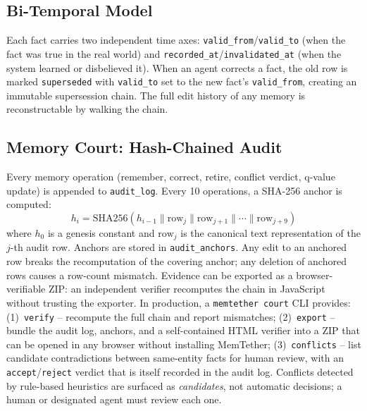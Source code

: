 ﻿\documentclass{article}
\begin{document}
\subsection{Bi-Temporal Model}
Each fact carries two independent time axes: \texttt{valid\_from}/\texttt{valid\_to} (when the fact was true in the real world) and \texttt{recorded\_at}/\texttt{invalidated\_at} (when the system learned or disbelieved it). When an agent corrects a fact, the old row is marked \texttt{superseded} with \texttt{valid\_to} set to the new fact's \texttt{valid\_from}, creating an immutable supersession chain. The full edit history of any memory is reconstructable by walking the chain.

\subsection{Memory Court: Hash-Chained Audit}
Every memory operation (remember, correct, retire, conflict verdict, q-value update) is appended to \texttt{audit\_log}. Every 10 operations, a SHA-256 anchor is computed:
\[
h_i = \text{SHA256}(h_{i-1} \| \text{row}_{j} \| \text{row}_{j+1} \| \cdots \| \text{row}_{j+9})
\]
where $h_0$ is a genesis constant and $\text{row}_j$ is the canonical text representation of the $j$-th audit row. Anchors are stored in \texttt{audit\_anchors}. Any edit to an anchored row breaks the recomputation of the covering anchor; any deletion of anchored rows causes a row-count mismatch. Evidence can be exported as a browser-verifiable ZIP: an independent verifier recomputes the chain in JavaScript without trusting the exporter. In production, a \texttt{memtether court} CLI provides: (1)~\texttt{verify} -- recompute the full chain and report mismatches; (2)~\texttt{export} -- bundle the audit log, anchors, and a self-contained HTML verifier into a ZIP that can be opened in any browser without installing MemTether; (3)~\texttt{conflicts} -- list candidate contradictions between same-entity facts for human review, with an \texttt{accept}/\texttt{reject} verdict that is itself recorded in the audit log. Conflicts detected by rule-based heuristics are surfaced as \emph{candidates}, not automatic decisions; a human or designated agent must review each one.
\end{document}
